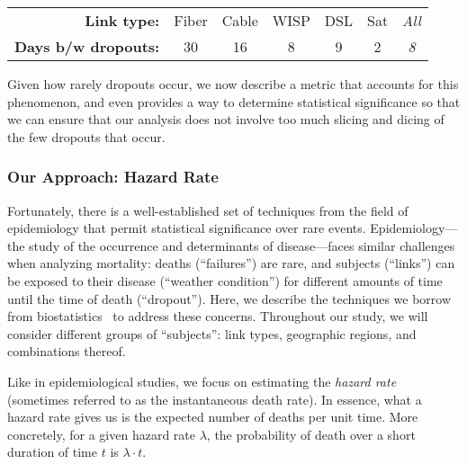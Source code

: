 \vspace{0.2cm}
\noindent
\begin{small}
	\begin{tabular}{@{~~}r@{~}c@{~}|@{~}c@{~}|@{~}c@{~}|@{~}c@{~}|@{~}c@{~}|@{~}c@{~}}
  \textbf{Link type:}    & Fiber & Cable & WISP & DSL & Sat & \textit{All} \\
  \textbf{Days b/w dropouts:} &   30  &   16  &    8 &   9 &   2 & \textit{8}   \\
\end{tabular}
\end{small}
\vspace{0.1cm}

Given how rarely dropouts occur, we now describe a metric that accounts for
this phenomenon, and even provides a way to determine statistical significance
so that we can ensure that our analysis does not involve too much slicing and
dicing of the few dropouts that occur.


\subsubsection*{Our Approach: Hazard Rate}
%
Fortunately, there is a well-established set of techniques from the
field of epidemiology that permit statistical significance over rare
events.
%
Epidemiology---the study of the occurrence and determinants of
disease---faces similar challenges when analyzing mortality: deaths
(``failures'') are rare, and subjects (``links'') can be exposed to
their disease (``weather condition'') for different amounts of time
until the time of death (``dropout'').
%
Here, we describe the techniques we borrow from
biostatistics~\cite{biostats-book} to address these concerns.
%
Throughout our study, we will consider different groups of ``subjects'':
link types, geographic regions, and combinations thereof.

Like in epidemiological studies, we focus on estimating the \emph{hazard rate}
(sometimes referred to as the instantaneous death rate).
%
In essence, what a hazard rate gives us is the expected number of deaths per
unit time.
%
More concretely, for a given hazard rate $\lambda$, the probability of death
over a short duration of time $t$ is $\lambda \cdot t$.


